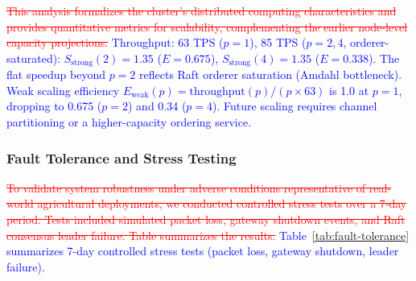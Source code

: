 \documentclass[pdflatex,sn-mathphys-num]{sn-jnl}
\theoremstyle{thmstyleone}
\theoremstyle{thmstyletwo}
\theoremstyle{thmstylethree}
\begin{document}
{\textcolor{red}{\sout{This analysis formalizes the cluster's distributed computing characteristics and provides quantitative metrics for scalability, complementing the earlier node‑level capacity projections.}}
\textcolor{blue}{Throughput: 63 TPS ($p=1$), 85 TPS ($p=2,4$, orderer-saturated): $S_{\text{strong}}(2)=1.35$ ($E=0.675$), $S_{\text{strong}}(4)=1.35$ ($E=0.338$). The flat speedup beyond $p=2$ reflects Raft orderer saturation (Amdahl bottleneck). Weak scaling efficiency $E_{\text{weak}}(p)=\text{throughput}(p)/(p\times63)$ is 1.0 at $p=1$, dropping to 0.675 ($p=2$) and 0.34 ($p=4$). Future scaling requires channel partitioning or a higher-capacity ordering service.}

\subsubsection{Fault Tolerance and Stress Testing}
\label{subsubsec:fault_tolerance}

\textcolor{red}{\sout{To validate system robustness under adverse conditions representative of real-world agricultural deployments, we conducted controlled stress tests over a 7‑day period. Tests included simulated packet loss, gateway shutdown events, and Raft consensus leader failure. Table summarizes the results.}}
\textcolor{blue}{Table~\ref{tab:fault-tolerance} summarizes 7-day controlled stress tests (packet loss, gateway shutdown, leader failure).}

}
\end{document}
